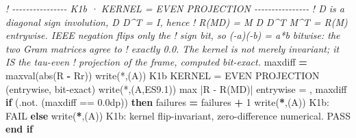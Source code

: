 \documentclass[10pt]{article}
\renewcommand{\_}{\origunderscore\allowbreak}
\newenvironment{Shaded}{}{}
\newcommand{\BuiltInTok}[1]{#1}
\newcommand{\CommentTok}[1]{\textit{#1}}
\newcommand{\DecValTok}[1]{#1}
\newcommand{\FloatTok}[1]{#1}
\newcommand{\FunctionTok}[1]{#1}
\newcommand{\KeywordTok}[1]{\textbf{#1}}
\newcommand{\NormalTok}[1]{#1}
\newcommand{\OperatorTok}[1]{#1}
\newcommand{\StringTok}[1]{#1}
\begin{document}
\begin{Shaded}
\begin{Highlighting}[]
  \CommentTok{! {-}{-}{-}{-}{-}{-}{-}{-}{-}{-}{-}{-}{-}{-}{-}{-} K1b · KERNEL = EVEN PROJECTION {-}{-}{-}{-}{-}{-}{-}{-}{-}{-}{-}{-}{-}{-}{-}{-}}
  \CommentTok{! D is a diagonal sign involution, D D\^{}T = I, hence}
  \CommentTok{! R(MD) = M D D\^{}T M\^{}T = R(M) entrywise. IEEE negation flips only the}
  \CommentTok{! sign bit, so ({-}a)({-}b) = a*b bitwise: the two Gram matrices agree to}
  \CommentTok{! exactly 0.0. The kernel is not merely invariant; it IS the tau{-}even}
  \CommentTok{! projection of the frame, computed bit{-}exact.}
\NormalTok{  maxdiff }\KeywordTok{=} \FunctionTok{maxval}\NormalTok{(}\BuiltInTok{abs}\NormalTok{(R }\KeywordTok{{-}}\NormalTok{ Rr))}
  \FunctionTok{write(*}\NormalTok{,}\StringTok{\textquotesingle{}(A)\textquotesingle{}}\FunctionTok{)} \StringTok{\textquotesingle{}K1b KERNEL = EVEN PROJECTION (entrywise, bit{-}exact)\textquotesingle{}}
  \FunctionTok{write(*}\NormalTok{,}\StringTok{\textquotesingle{}(A,ES9.1)\textquotesingle{}}\FunctionTok{)} \StringTok{\textquotesingle{}  max |R {-} R(MD)| entrywise = \textquotesingle{}}\NormalTok{, maxdiff}
  \KeywordTok{if}\NormalTok{ (}\OperatorTok{.not.}\NormalTok{ (maxdiff }\OperatorTok{==} \FloatTok{0.0\_dp}\NormalTok{)) }\KeywordTok{then}
\BuiltInTok{     f}\NormalTok{ailures }\KeywordTok{=}\NormalTok{ failures }\KeywordTok{+} \DecValTok{1}
\BuiltInTok{     w}\NormalTok{rite(}\KeywordTok{*}\NormalTok{,}\StringTok{\textquotesingle{}(A)\textquotesingle{}}\NormalTok{) }\StringTok{\textquotesingle{}  K1b: FAIL\textquotesingle{}}
  \KeywordTok{else}
\BuiltInTok{     w}\NormalTok{rite(}\KeywordTok{*}\NormalTok{,}\StringTok{\textquotesingle{}(A)\textquotesingle{}}\NormalTok{) }\StringTok{\textquotesingle{}  K1b: kernel flip{-}invariant, zero{-}difference numerical. PASS\textquotesingle{}}
  \KeywordTok{end if}


\end{Highlighting}
\end{Shaded}
\end{document}
